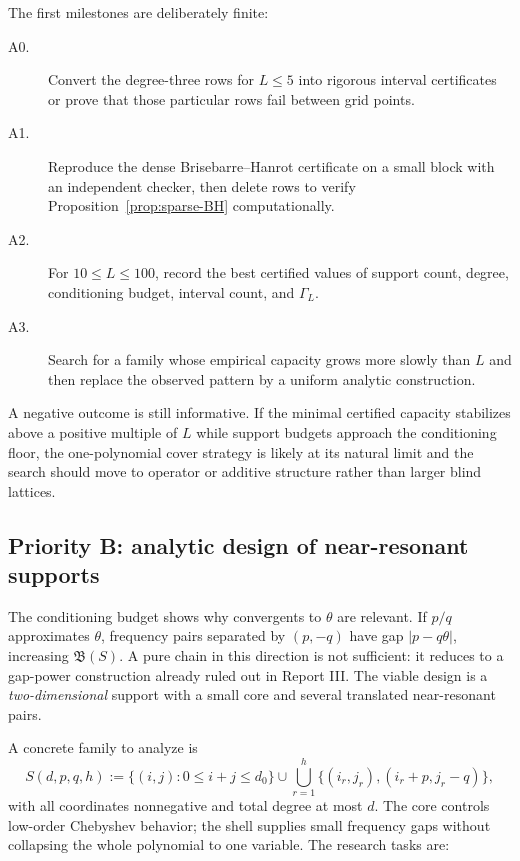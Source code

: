 \documentclass[11pt,oneside]{article}
\theoremstyle{definition}
\theoremstyle{remark}
\newcommand{\tht}{\theta}
\begin{document}
The first milestones are deliberately finite:

\begin{description}
\item[A0.] Convert the degree-three rows for $L\le5$ into rigorous interval certificates or prove
that those particular rows fail between grid points.
\item[A1.] Reproduce the dense Brisebarre--Hanrot certificate on a small block with an independent
checker, then delete rows to verify Proposition~\ref{prop:sparse-BH} computationally.
\item[A2.] For $10\le L\le100$, record the best certified values of support count, degree,
conditioning budget, interval count, and $\Gamma_L$.
\item[A3.] Search for a family whose empirical capacity grows more slowly than $L$ and then replace
the observed pattern by a uniform analytic construction.
\end{description}

A negative outcome is still informative.  If the minimal certified capacity stabilizes above a
positive multiple of $L$ while support budgets approach the conditioning floor, the one-polynomial
cover strategy is likely at its natural limit and the search should move to operator or additive
structure rather than larger blind lattices.

\subsection{Priority B: analytic design of near-resonant supports}

The conditioning budget shows why convergents to $\tht$ are relevant.  If
$p/q$ approximates $\tht$, frequency pairs separated by $(p,-q)$ have gap
$|p-q\tht|$, increasing $\mathfrak B(S)$.  A pure chain in this direction is not sufficient: it
reduces to a gap-power construction already ruled out in Report III.  The viable design is a
\emph{two-dimensional} support with a small core and several translated near-resonant pairs.

A concrete family to analyze is
\begin{equation}
  S(d,p,q,h):=
  \{(i,j):0\le i+j\le d_0\}
  \cup
  \bigcup_{r=1}^{h}\{(i_r,j_r),(i_r+p,j_r-q)\},
  \label{eq:core-shell-support}
\end{equation}
with all coordinates nonnegative and total degree at most $d$.  The core controls low-order
Chebyshev behavior; the shell supplies small frequency gaps without collapsing the whole
polynomial to one variable.  The research tasks are:
\end{document}
